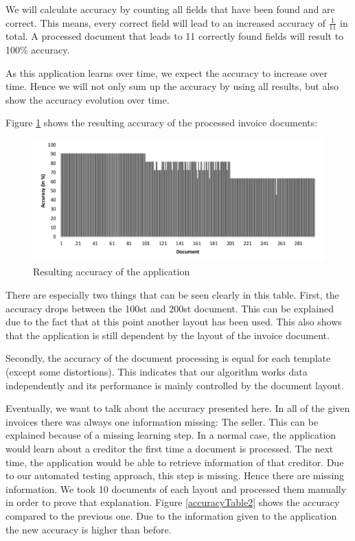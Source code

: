 We will calculate accuracy by counting all fields that have been found and are correct. This means, every correct field will lead to an increased accuracy of $\frac{1}{11}$ in total. A processed document that leads to 11 correctly found fields will result to 100\% accuracy. 

As this application learns over time, we expect the accuracy to increase over time. Hence we will not only sum up the accuracy by using all results, but also show the accuracy evolution over time.

Figure \ref{accuracyTable} shows the resulting accuracy of the processed invoice documents: 
\begin{figure}[ht!]
\centering
\includegraphics[width=\textwidth]{Images/Accuracy/Values.pdf}
\caption{Resulting accuracy of the application \label{accuracyTable}}
\end{figure}

There are especially two things that can be seen clearly in this table. First, the accuracy drops between the 100st and 200st document. This can be explained due to the fact that at this point another layout has been used. This also shows that the application is still dependent by the layout of the invoice document.

Secondly, the accuracy of the document processing is equal for each template (except some distortions). This indicates that our algorithm works data independently and its performance is mainly controlled by the document layout.

Eventually, we want to talk about the accuracy presented here. In all of the given invoices there was always one information missing: The seller. This can be explained because of a missing learning step. In a normal case, the application would learn about a creditor the first time a document is processed. The next time, the application would be able to retrieve information of that creditor. Due to our automated testing approach, this step is missing. Hence there are missing information.
We took 10 documents of each layout and processed them manually in order to prove that explanation. Figure \ref{accuracyTable2} shows the accuracy compared to the previous one. Due to the information given to the application the new accuracy is higher than before.

